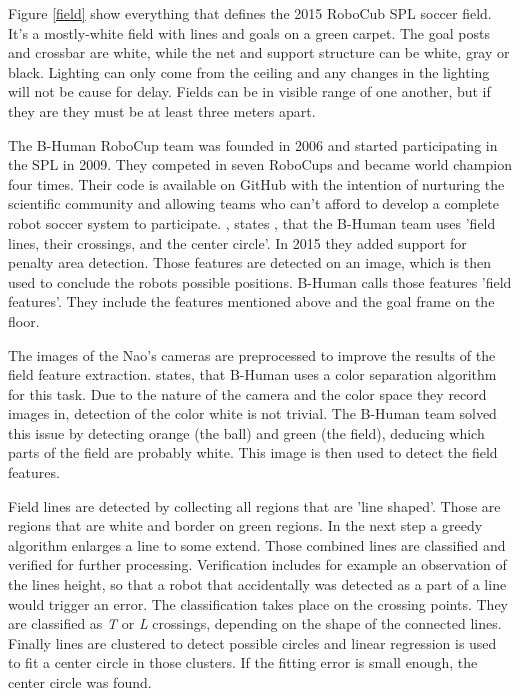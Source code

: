 \documentclass[12pt, a4paper, doc]{apa6}
\begin{document}
  Figure \ref{field} show everything that defines the 2015 RoboCub SPL soccer field. It's a mostly-white field with lines and goals on a green carpet. The goal posts and crossbar are white, while the net and support structure can be white, gray or black. Lighting can only come from the ceiling and any changes in the lighting will not be cause for delay. Fields can be in visible range of one another, but if they are they must be at least three meters apart.

  The B-Human RoboCup team was founded in 2006 and started participating in the SPL in 2009. They competed in seven RoboCups and became world champion four times. Their code is available on GitHub with the intention of nurturing the scientific community and allowing teams who can't afford to develop a complete robot soccer system to participate. \cite{bhumanvis}, states  , that the B-Human team uses 'field lines, their crossings, and the center circle'. In 2015 they added support for penalty area detection. Those features are detected on an image, which is then used to conclude the robots possible positions. B-Human calls those features 'field features'. They include the features mentioned above and the goal frame on the floor.

  The images of the Nao's cameras are preprocessed to improve the results of the field feature extraction. \cite{bhumanvis} states, that B-Human uses a color separation algorithm for this task. Due to the nature of the camera and the color space they record images in, detection of the color white is not trivial. The B-Human team solved this issue by detecting orange (the ball) and green (the field), deducing which parts of the field are probably white. This image is then used to detect the field features.

  Field lines are detected by collecting all regions that are 'line shaped'. Those are regions that are white and border on green regions. In the next step a greedy algorithm enlarges a line to some extend. Those combined lines are classified and verified for further processing. Verification includes for example an observation of the lines height, so that a robot that accidentally was detected as a part of a line would trigger an error. The classification takes place on the crossing points. They are classified as \emph{T} or \emph{L} crossings, depending on the shape of the connected lines. Finally lines are clustered to detect possible circles and linear regression is used to fit a center circle in those clusters. If the fitting error is small enough, the center circle was found.
\end{document}
